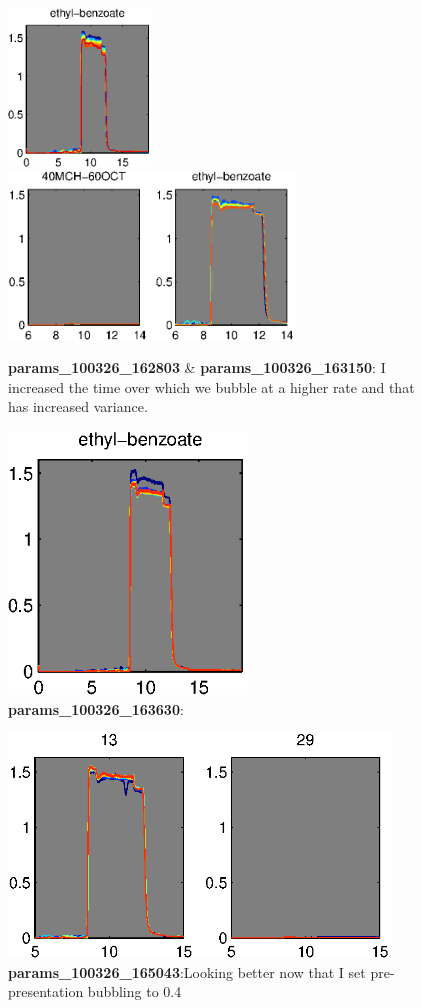 \documentclass[a4paper]{report}
\begin{document}
\begin{figure}
\centering
\includegraphics[width=1.5in]{params_100326_162803.eps}
\includegraphics[width=3in]{params_100326_163150.eps}
\caption{\textbf{params\_100326\_162803} \&
  \textbf{params\_100326\_163150}: I increased the time over
  which we bubble at a higher rate and that has increased variance. }
\end{figure}

\begin{figure}
\centering
\includegraphics[width=2.5in]{params_100326_163630.eps}
\caption{\textbf{params\_100326\_163630}:}
\end{figure}


\begin{figure}
\centering
\includegraphics[width=4in]{params_100326_165043.eps}
\caption{\textbf{params\_100326\_165043}:Looking better now that I set
  pre-presentation bubbling to 0.4 }
\end{figure}
\end{document}
